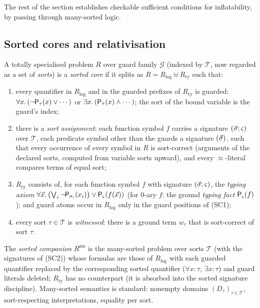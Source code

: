 The rest of the section establishes checkable sufficient conditions
for inflatability, by passing through many-sorted logic.

\subsection{Sorted cores and relativisation}

\begin{definition}
\label{def:sorted-core}
A totally specialised problem $R$ over guard family $\mathcal{G}$
(indexed by $\mathcal{T}$, now regarded as a set of \emph{sorts}) is
a \emph{sorted core} if it splits as $R = R_{\mathrm{log}} \uplus
R_{\mathrm{ty}}$ such that:
\begin{enumerate}[label=(SC\arabic*),leftmargin=3.2em]
\item every quantifier in $R_{\mathrm{log}}$ and in the guarded
  prefixes of $R_{\mathrm{ty}}$ is guarded: $\forall x.\,
  (\neg\mathsf{P}_{\tau}(x) \vee \cdots)$ or $\exists x.\,
  (\mathsf{P}_{\tau}(x) \wedge \cdots)$; the sort of the bound variable
  is the guard's index;
\item there is a \emph{sort assignment}: each function symbol
  $f$ carries a signature $(\vec{\sigma}; \varsigma)$ over
  $\mathcal{T}$, each predicate symbol other than the guards a
  signature $(\vec{\sigma})$, such that every occurrence of every
  symbol in $R$ is sort-correct (arguments of the declared sorts,
  computed from variable sorts upward), and every $\approx$-literal
  compares terms of equal sort;
\item $R_{\mathrm{ty}}$ consists of, for each function symbol $f$
  with signature $(\vec{\sigma}; \varsigma)$, the \emph{typing
  axiom} $\forall \vec{x}.\, \bigl(\bigvee_i
  \neg\mathsf{P}_{\sigma_i}(x_i)\bigr) \vee
  \mathsf{P}_{\varsigma}(f(\vec{x}))$ (for $0$-ary $f$: the ground
  \emph{typing fact} $\mathsf{P}_{\varsigma}(f)$); and guard atoms occur
  in $R_{\mathrm{log}}$ only in the guard positions of (SC1);
\item every sort $\tau \in \mathcal{T}$ is \emph{witnessed}: there
  is a ground term $w_\tau$ that is sort-correct of sort $\tau$.
\end{enumerate}
The \emph{sorted companion} $R^{\mathrm{ms}}$ is the many-sorted
problem over sorts $\mathcal{T}$ (with the signatures of (SC2))
whose formulas are those of $R_{\mathrm{log}}$ with each guarded
quantifier replaced by the corresponding sorted quantifier
($\forall x{:}\tau$, $\exists x{:}\tau$) and guard literals deleted;
$R_{\mathrm{ty}}$ has no counterpart (it is absorbed into the sorted
signature discipline).  Many-sorted semantics is standard: nonempty
domains $(D_\tau)_{\tau \in \mathcal{T}}$, sort-respecting
interpretations, equality per sort.
\end{definition}

